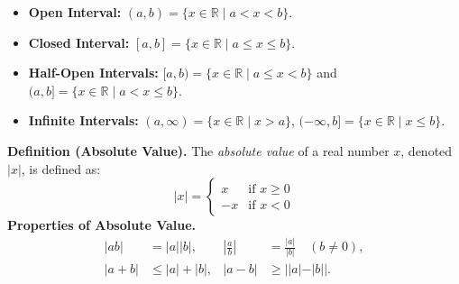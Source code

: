 \documentclass[11pt,a4paper]{article}
\begin{document}
\begin{itemize}
\item \textbf{Open Interval:} $(a, b) = \{x \in \mathbb{R} \mid a < x < b\}$.
\item \textbf{Closed Interval:} $[a, b] = \{x \in \mathbb{R} \mid a \leq x \leq b\}$.
\item \textbf{Half-Open Intervals:} $[a, b) = \{x \in \mathbb{R} \mid a \leq x < b\}$ and $(a, b] = \{x \in \mathbb{R} \mid a < x \leq b\}$.
\item \textbf{Infinite Intervals:} $(a, \infty) = \{x \in \mathbb{R} \mid x > a\}$, $(-\infty, b] = \{x \in \mathbb{R} \mid x \leq b\}$.
\end{itemize}
\textbf{Definition (Absolute Value).} The \textit{absolute value} of a real number $x$, denoted $|x|$, is defined as:
\begin{equation*}
|x| = \begin{cases} 
x & \text{if } x \geq 0 \\
-x & \text{if } x < 0 
\end{cases}
\end{equation*}
\textbf{Properties of Absolute Value.}
\begin{align*}
|ab| &= |a||b|, & \left|\frac{a}{b}\right| &= \frac{|a|}{|b|} \quad (b \neq 0), \\
|a + b| &\leq |a| + |b|, & |a - b| &\geq ||a| - |b||.
\end{align*}
\end{document}
